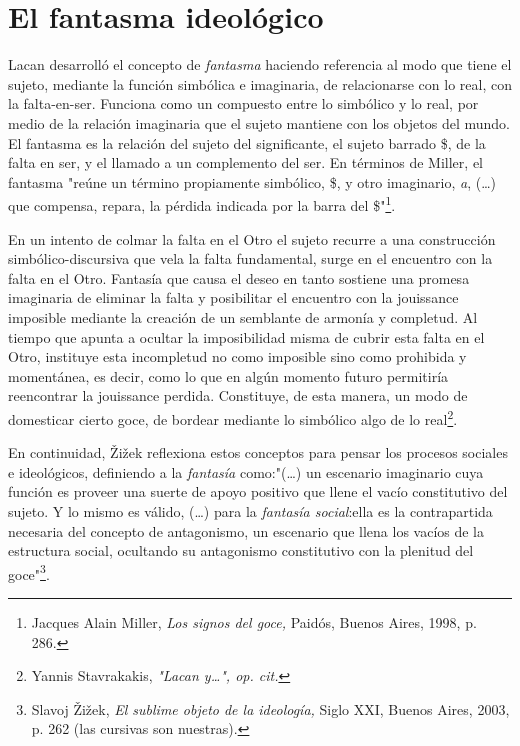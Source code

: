 \section{El fantasma ideológico}

Lacan desarrolló el concepto de \emph{fantasma} haciendo referencia al
modo que tiene el sujeto, mediante la función simbólica e imaginaria, de
relacionarse con lo real, con la falta-en-ser. Funciona como un
compuesto entre lo simbólico y lo real, por medio de la relación
imaginaria que el sujeto mantiene con los objetos del mundo. El fantasma
es la relación del sujeto del significante, el sujeto barrado \$, de la
falta en ser, y el llamado a un complemento del ser. En términos de
Miller, el fantasma "reúne un término propiamente simbólico, \$, y otro
imaginario, \emph{a}, (\dots) que compensa, repara, la pérdida
indicada por la barra del \$"\footnote{Jacques Alain Miller, \emph{Los
  signos del goce,} Paidós, Buenos Aires, 1998, p. 286.}.

En un intento de colmar la falta en el Otro el sujeto recurre a una
construcción simbólico-discursiva que vela la falta fundamental, surge
en el encuentro con la falta en el Otro. Fantasía que causa el deseo en
tanto sostiene una promesa imaginaria de eliminar la falta y posibilitar
el encuentro con la jouissance imposible mediante la creación de un
semblante de armonía y completud. Al tiempo que apunta a ocultar la
imposibilidad misma de cubrir esta falta en el Otro, instituye esta
incompletud no como imposible sino como prohibida y momentánea, es
decir, como lo que en algún momento futuro permitiría reencontrar la
jouissance perdida. Constituye, de esta manera, un modo de domesticar
cierto goce, de bordear mediante lo simbólico algo de lo
real\footnote{Yannis Stavrakakis, \emph{"Lacan y\ldots", op. cit.}}.

En continuidad, Žižek reflexiona estos conceptos para pensar los
procesos sociales e ideológicos, definiendo a la \emph{fantasía}
como:"(\dots) un escenario imaginario cuya función es proveer una
suerte de apoyo positivo que llene el vacío constitutivo del sujeto. Y
lo mismo es válido, (\dots) para la \emph{fantasía social}:ella es
la contrapartida necesaria del concepto de antagonismo, un escenario que
llena los vacíos de la estructura social, ocultando su antagonismo
constitutivo con la plenitud del goce"\footnote{Slavoj Žižek, \emph{El
  sublime objeto de la ideología,} Siglo XXI, Buenos Aires, 2003, p. 262
  (las cursivas son nuestras).}.

